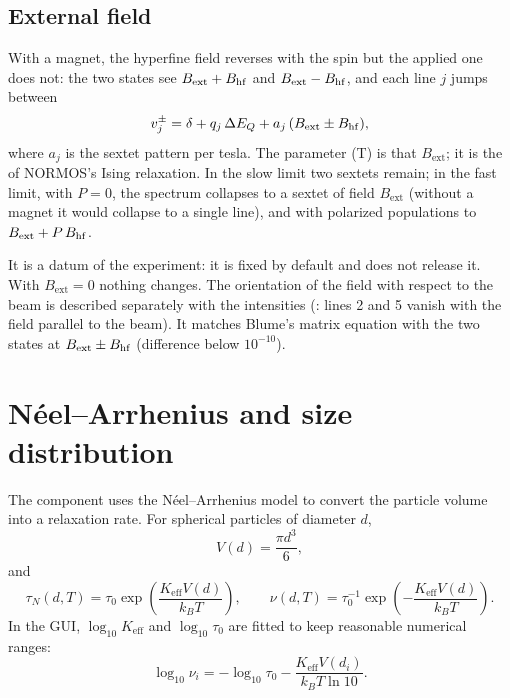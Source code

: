 \subsection{External field}
\label{sec:relax-bext}

With a magnet, the hyperfine field reverses with the spin but the applied one does
not: the two states see $B_\mathrm{ext}+B_{\mathrm{hf}}$ and $B_\mathrm{ext}-B_{\mathrm{hf}}$, and each
line $j$ jumps between
\begin{equation}
  v_j^\pm = \delta + q_j\,\Delta E_{Q} + a_j\,(B_\mathrm{ext} \pm B_{\mathrm{hf}}),
\end{equation}
where $a_j$ is the sextet pattern per tesla. The 
parameter (T) is that $B_\mathrm{ext}$; it is the  of NORMOS's Ising
relaxation. In the slow limit two sextets remain; in the fast limit, with $P=0$,
the spectrum collapses to a sextet of field $B_\mathrm{ext}$ (without a magnet it
would collapse to a single line), and with polarized populations to
$B_\mathrm{ext}+P\,B_{\mathrm{hf}}$.

It is a datum of the experiment: it is fixed by default and  does
not release it. With $B_\mathrm{ext}=0$ nothing changes. The orientation of the
field with respect to the beam is described separately with the intensities
(: lines 2 and 5 vanish with the field parallel to the beam). It
matches Blume's matrix equation with the two states at $B_\mathrm{ext}\pm B_{\mathrm{hf}}$
(difference below $10^{-10}$).

\section{Néel--Arrhenius and size distribution}

The  component uses the Néel--Arrhenius model to convert the
particle volume into a relaxation rate. For spherical particles of diameter $d$,
\begin{equation}
  V(d)=\frac{\pi d^3}{6},
\end{equation}
and
\begin{equation}
  \tau_N(d,T)=\tau_0\exp\left(\frac{K_{\mathrm{eff}}V(d)}{k_B T}\right),
  \qquad
  \nu(d,T)=\tau_0^{-1}\exp\left(-\frac{K_{\mathrm{eff}}V(d)}{k_B T}\right).
\end{equation}
In the GUI, $\log_{10}K_{\mathrm{eff}}$ and $\log_{10}\tau_0$ are fitted to keep
reasonable numerical ranges:
\begin{equation}
  \log_{10}\nu_i=-\log_{10}\tau_0
  -\frac{K_{\mathrm{eff}}V(d_i)}{k_BT\ln 10}.
\end{equation}

